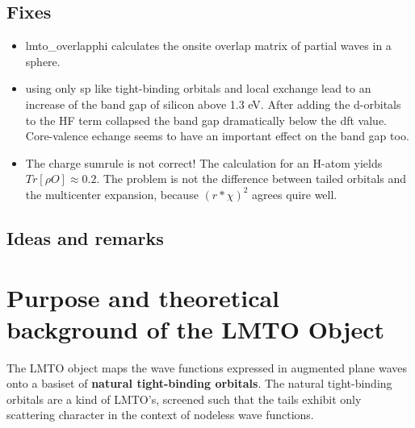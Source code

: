 \documentclass[11pt,a4paper]{report}
\begin{document}
\section{Fixes}
\begin{itemize}
\item lmto\_overlapphi calculates the onsite overlap matrix of partial
  waves in a sphere.
%
\item using only sp like tight-binding orbitals and local exchange
  lead to an increase of the band gap of silicon above 1.3 eV. After
  adding the d-orbitals to the HF term collapsed the band gap
  dramatically below the dft value. Core-valence echange seems to have
  an important effect on the band gap too.
%

%
\item The charge sumrule is not correct! The calculation for an H-atom
  yields $Tr[\rho O]\approx 0.2$. The problem is not the difference
  between tailed orbitals and the multicenter expansion, because
  $(r*\chi)^2$ agrees quire well.
%
\end{itemize}


\section{Ideas and remarks}

\chapter{Purpose and theoretical background of the LMTO Object}
The LMTO object maps the wave functions expressed in augmented plane
waves onto a basiset of \textbf{natural tight-binding
  orbitals}. The natural
tight-binding orbitals are a kind of LMTO's, screened such that the
tails exhibit only scattering character in the context of nodeless
wave functions\cite{bloechl12_arxiv1210_5937}.
\end{document}
